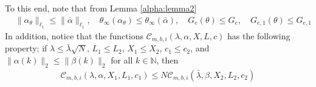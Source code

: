 \documentclass{article}
\newcommand{\e}{\mathbf{e}}
\begin{document}
    
    To this end, note that 
    from Lemma \ref{alpha:lemma2}
    \begin{equation}
      \label{thm:bounded:alt:col:pf:eq01}
      \begin{aligned}
       & \|\alpha_{\theta}\|_{\ell_1} \le \|\bar{\alpha}\|_{\ell_1}, \quad \theta_{\infty}(\alpha_{\theta}) \le \theta_{\infty}(\bar{\alpha}), \quad
        G_e(\theta) \le G_e, \quad  G_{e,1}(\theta) \le G_{e,1}
      \end{aligned}
    \end{equation} 
    In addition, notice that %
     the functions
    $\mathcal{C}_{m,b,i}(\lambda,\alpha,X,L,c)$ 
    has the following property;
    if $\lambda \le \bar{\lambda}\sqrt{N}$, $L_1 \le L_2$, $X_1 \le X_2$, $c_1 \le c_2$, and $\|\alpha(k)\|_2 \le \|\beta(k)\|_2$ for all $k \in \mathbb{N}$, then 
    \begin{equation}
      \label{thm:bounded:alt:col:pf:eq2}
      \begin{aligned}
       \mathcal{C}_{m,b,i}(\lambda,\alpha,X_1,L_1,c_1) \le N\mathcal{C}_{m,b,i}(\bar{\lambda},\beta,X_2,L_2,c_2)
      \end{aligned}
    \end{equation}
\end{document}
